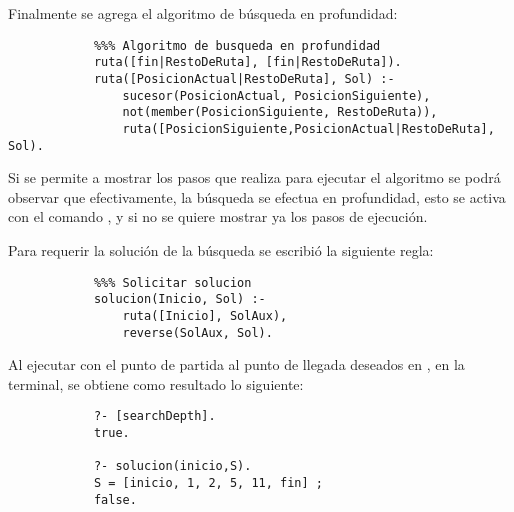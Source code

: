 \begin{solution}
        Finalmente se agrega el algoritmo de búsqueda en profundidad:
        \begin{verbatim}
            %%% Algoritmo de busqueda en profundidad
            ruta([fin|RestoDeRuta], [fin|RestoDeRuta]).
            ruta([PosicionActual|RestoDeRuta], Sol) :-
                sucesor(PosicionActual, PosicionSiguiente),
                not(member(PosicionSiguiente, RestoDeRuta)),
                ruta([PosicionSiguiente,PosicionActual|RestoDeRuta], Sol).
        \end{verbatim}

        Si se permite a  mostrar los pasos que realiza para ejecutar el algoritmo se podrá observar que efectivamente, la búsqueda se efectua en profundidad, esto se activa con el comando , y  si no se quiere mostrar ya los pasos de ejecución.

        Para requerir la solución de la búsqueda se escribió la siguiente regla:
        \begin{verbatim}
            %%% Solicitar solucion
            solucion(Inicio, Sol) :-
                ruta([Inicio], SolAux),
                reverse(SolAux, Sol).
        \end{verbatim}
        
        Al ejecutar  con el punto de partida al punto de llegada deseados en , en la terminal, se obtiene como resultado lo siguiente:
        \begin{verbatim}
            ?- [searchDepth].
            true.

            ?- solucion(inicio,S).
            S = [inicio, 1, 2, 5, 11, fin] ;
            false.
        \end{verbatim}


\end{solution}
